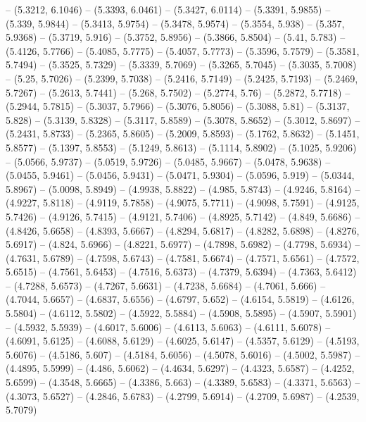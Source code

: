 {  -- (5.3212, 6.1046) -- (5.3393, 6.0461) -- (5.3427, 6.0114) -- (5.3391, 
  5.9855) -- (5.339, 5.9844) -- (5.3413, 5.9754) -- (5.3478, 5.9574) -- (5.3554,
   5.938) -- (5.357, 5.9368) -- (5.3719, 5.916) -- (5.3752, 5.8956) -- (5.3866, 
  5.8504) -- (5.41, 5.783) -- (5.4126, 5.7766) -- (5.4085, 5.7775) -- (5.4057, 
  5.7773) -- (5.3596, 5.7579) -- (5.3581, 5.7494) -- (5.3525, 5.7329) -- 
  (5.3339, 5.7069) -- (5.3265, 5.7045) -- (5.3035, 5.7008) -- (5.25, 5.7026) -- 
  (5.2399, 5.7038) -- (5.2416, 5.7149) -- (5.2425, 5.7193) -- (5.2469, 5.7267) 
  -- (5.2613, 5.7441) -- (5.268, 5.7502) -- (5.2774, 5.76) -- (5.2872, 5.7718) 
  -- (5.2944, 5.7815) -- (5.3037, 5.7966) -- (5.3076, 5.8056) -- (5.3088, 5.81) 
  -- (5.3137, 5.828) -- (5.3139, 5.8328) -- (5.3117, 5.8589) -- (5.3078, 5.8652)
   -- (5.3012, 5.8697) -- (5.2431, 5.8733) -- (5.2365, 5.8605) -- (5.2009, 
  5.8593) -- (5.1762, 5.8632) -- (5.1451, 5.8577) -- (5.1397, 5.8553) -- 
  (5.1249, 5.8613) -- (5.1114, 5.8902) -- (5.1025, 5.9206) -- (5.0566, 5.9737) 
  -- (5.0519, 5.9726) -- (5.0485, 5.9667) -- (5.0478, 5.9638) -- (5.0455, 
  5.9461) -- (5.0456, 5.9431) -- (5.0471, 5.9304) -- (5.0596, 5.919) -- (5.0344,
   5.8967) -- (5.0098, 5.8949) -- (4.9938, 5.8822) -- (4.985, 5.8743) -- 
  (4.9246, 5.8164) -- (4.9227, 5.8118) -- (4.9119, 5.7858) -- (4.9075, 5.7711) 
  -- (4.9098, 5.7591) -- (4.9125, 5.7426) -- (4.9126, 5.7415) -- (4.9121, 
  5.7406) -- (4.8925, 5.7142) -- (4.849, 5.6686) -- (4.8426, 5.6658) -- (4.8393,
   5.6667) -- (4.8294, 5.6817) -- (4.8282, 5.6898) -- (4.8276, 5.6917) -- 
  (4.824, 5.6966) -- (4.8221, 5.6977) -- (4.7898, 5.6982) -- (4.7798, 5.6934) --
   (4.7631, 5.6789) -- (4.7598, 5.6743) -- (4.7581, 5.6674) -- (4.7571, 5.6561) 
  -- (4.7572, 5.6515) -- (4.7561, 5.6453) -- (4.7516, 5.6373) -- (4.7379, 
  5.6394) -- (4.7363, 5.6412) -- (4.7288, 5.6573) -- (4.7267, 5.6631) -- 
  (4.7238, 5.6684) -- (4.7061, 5.666) -- (4.7044, 5.6657) -- (4.6837, 5.6556) --
   (4.6797, 5.652) -- (4.6154, 5.5819) -- (4.6126, 5.5804) -- (4.6112, 5.5802) 
  -- (4.5922, 5.5884) -- (4.5908, 5.5895) -- (4.5907, 5.5901) -- (4.5932, 
  5.5939) -- (4.6017, 5.6006) -- (4.6113, 5.6063) -- (4.6111, 5.6078) -- 
  (4.6091, 5.6125) -- (4.6088, 5.6129) -- (4.6025, 5.6147) -- (4.5357, 5.6129) 
  -- (4.5193, 5.6076) -- (4.5186, 5.607) -- (4.5184, 5.6056) -- (4.5078, 5.6016)
   -- (4.5002, 5.5987) -- (4.4895, 5.5999) -- (4.486, 5.6062) -- (4.4634, 
  5.6297) -- (4.4323, 5.6587) -- (4.4252, 5.6599) -- (4.3548, 5.6665) -- 
  (4.3386, 5.663) -- (4.3389, 5.6583) -- (4.3371, 5.6563) -- (4.3073, 5.6527) --
   (4.2846, 5.6783) -- (4.2799, 5.6914) -- (4.2709, 5.6987) -- (4.2539, 5.7079) 
}
